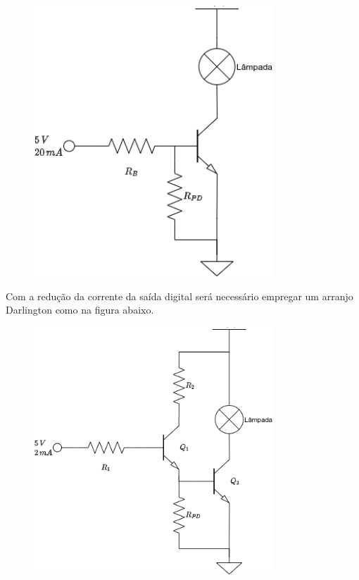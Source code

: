 \documentclass[a4paper]{report}
\begin{document}
\begin{figure}[H]
    \centering
    \includegraphics[width=0.8\textwidth]{figures/lista1-c.png}
\end{figure}


Com a redução da corrente da saída digital será necessário empregar um arranjo Darlington como na figura abaixo.

\begin{figure}[H]
    \centering
    \includegraphics[width=0.8\textwidth]{figures/lista1-d.png}
\end{figure}
\end{document}
